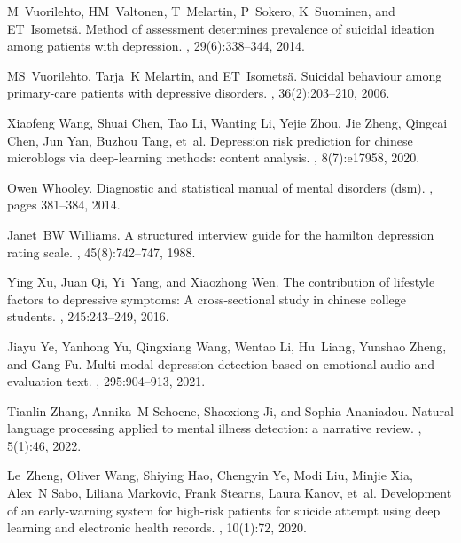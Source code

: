 \begin{thebibliography}{10}
M~Vuorilehto, HM~Valtonen, T~Melartin, P~Sokero, K~Suominen, and
  ET~Isomets{\"a}.
\newblock Method of assessment determines prevalence of suicidal ideation among
  patients with depression.
, 29(6):338--344, 2014.

MS~Vuorilehto, Tarja~K Melartin, and ET~Isomets{\"a}.
\newblock Suicidal behaviour among primary-care patients with depressive
  disorders.
, 36(2):203--210, 2006.

Xiaofeng Wang, Shuai Chen, Tao Li, Wanting Li, Yejie Zhou, Jie Zheng, Qingcai
  Chen, Jun Yan, Buzhou Tang, et~al.
\newblock Depression risk prediction for chinese microblogs via deep-learning
  methods: content analysis.
, 8(7):e17958, 2020.

Owen Whooley.
\newblock Diagnostic and statistical manual of mental disorders (dsm).
, pages 381--384, 2014.

Janet~BW Williams.
\newblock A structured interview guide for the hamilton depression rating
  scale.
, 45(8):742--747, 1988.

Ying Xu, Juan Qi, Yi~Yang, and Xiaozhong Wen.
\newblock The contribution of lifestyle factors to depressive symptoms: A
  cross-sectional study in chinese college students.
, 245:243--249, 2016.

Jiayu Ye, Yanhong Yu, Qingxiang Wang, Wentao Li, Hu~Liang, Yunshao Zheng, and
  Gang Fu.
\newblock Multi-modal depression detection based on emotional audio and
  evaluation text.
, 295:904--913, 2021.

Tianlin Zhang, Annika~M Schoene, Shaoxiong Ji, and Sophia Ananiadou.
\newblock Natural language processing applied to mental illness detection: a
  narrative review.
, 5(1):46, 2022.

Le~Zheng, Oliver Wang, Shiying Hao, Chengyin Ye, Modi Liu, Minjie Xia, Alex~N
  Sabo, Liliana Markovic, Frank Stearns, Laura Kanov, et~al.
\newblock Development of an early-warning system for high-risk patients for
  suicide attempt using deep learning and electronic health records.
, 10(1):72, 2020.


\end{thebibliography}
